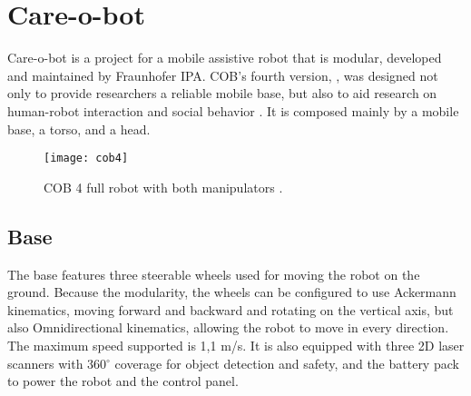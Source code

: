 

\section{Care-o-bot}

Care-o-bot is a project for a mobile assistive robot that is modular, developed and maintained by Fraunhofer IPA. COB's fourth version, , was designed not only to provide researchers a reliable mobile base, but also to aid research on human-robot interaction and social behavior \cite{mci/Kittmann2015}. It is composed mainly by a mobile base, a torso, and a head.

\begin{figure}[!ht]
\centering
\texttt{[image: cob4]}
\caption[COB 4 full robot with both manipulators.]{COB 4 full robot with both manipulators \cite{care-o-bot-image-full}.}
\label{fig:cob4}
\end{figure}

\subsection{Base}

The base features three steerable wheels used for moving the robot on the ground. Because the modularity, the wheels can be configured to use Ackermann kinematics, moving forward and backward and rotating on the vertical axis, but also Omnidirectional kinematics, allowing the robot to move in every direction. The maximum speed supported is 1,1 m/s. It is also equipped with three 2D laser scanners with 360$^{\circ}$ coverage for object detection and safety, and the battery pack to power the robot and the control panel.

